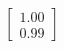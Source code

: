 \documentclass[preview]{standalone}
\begin{document}
\begin{align*}
\begin{bmatrix} 1.00 \\ 0.99 \end{bmatrix}
\end{align*}
\end{document}

